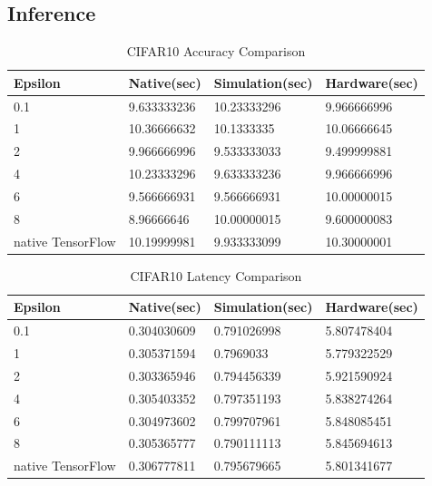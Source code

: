 \subsection{Inference}
\begin{table}[h!]
  \begin{center}
    \caption{CIFAR10 Accuracy Comparison}
    \label{tab:table}
    \begin{tabular}{l|l|l|l}
      \textbf{Epsilon} & \textbf{Native(sec)} & \textbf{Simulation(sec)} & \textbf{Hardware(sec)}\\
      \hline
0.1 &        9.633333236 &        10.23333296 &        9.966666996\\
1 &        10.36666632 &        10.1333335 &        10.06666645\\
2 &        9.966666996 &        9.533333033 &        9.499999881\\
4 &        10.23333296 &        9.633333236 &        9.966666996\\
6 &        9.566666931 &        9.566666931 &        10.00000015\\
8 &        8.96666646 &        10.00000015 &        9.600000083\\
native TensorFlow &        10.19999981 &        9.933333099 &        10.30000001\\    
    \end{tabular}
   \end{center}
\end{table}
\begin{table}[h!]
  \begin{center}
    \caption{CIFAR10 Latency Comparison}
    \label{tab:table}
    \begin{tabular}{l|l|l|l}
      \textbf{Epsilon} & \textbf{Native(sec)} & \textbf{Simulation(sec)} & \textbf{Hardware(sec)}\\
      \hline
0.1 &        0.304030609 &        0.791026998 &        5.807478404\\
1 &        0.305371594 &        0.7969033 &        5.779322529\\
2 &        0.303365946 &        0.794456339 &        5.921590924\\
4 &        0.305403352 &        0.797351193 &        5.838274264\\
6 &        0.304973602 &        0.799707961 &        5.848085451\\
8 &        0.305365777 &        0.790111113 &        5.845694613\\
native TensorFlow &        0.306777811 &        0.795679665 &        5.801341677\\
    \end{tabular}
   \end{center}
\end{table}


